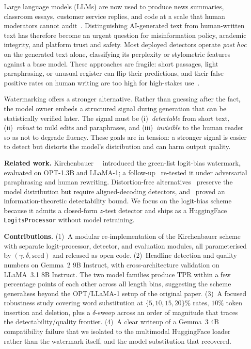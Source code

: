\documentclass[10pt,twocolumn,letterpaper]{article}
\begin{document}
Large language models (LLMs) are now used to produce news summaries, classroom essays, customer service replies, and code at a scale that human moderators cannot audit~\cite{kirchenbauer2023,kirchenbauer2024reliability}. Distinguishing AI-generated text from human-written text has therefore become an urgent question for misinformation policy, academic integrity, and platform trust and safety. Most deployed detectors operate \emph{post hoc} on the generated text alone, classifying its perplexity or stylometric features against a base model. These approaches are fragile: short passages, light paraphrasing, or unusual register can flip their predictions, and their false-positive rates on human writing are too high for high-stakes use~\cite{kirchenbauer2024reliability}.

Watermarking offers a stronger alternative. Rather than guessing after the fact, the model owner embeds a structured signal during generation that can be statistically verified later. The signal must be (i)~\emph{detectable} from short text, (ii)~\emph{robust} to mild edits and paraphrases, and (iii)~\emph{invisible} to the human reader so as not to degrade fluency. These goals are in tension: a stronger signal is easier to detect but distorts the model's distribution and can harm output quality.

\textbf{Related work.} Kirchenbauer~\etal~\cite{kirchenbauer2023} introduced the green-list logit-bias watermark, evaluated on OPT-1.3B and LLaMA-1; a follow-up~\cite{kirchenbauer2024reliability} re-tested it under adversarial paraphrasing and human rewriting. Distortion-free alternatives~\cite{kuditipudi2023robust} preserve the model distribution but require aligned-decoding detectors, and~\cite{christ2024undetectable} proved an information-theoretic detectability bound. We focus on the logit-bias scheme because it admits a closed-form $z$-test detector and ships as a HuggingFace \texttt{LogitsProcessor} without model retraining.

\textbf{Contributions.} (1)~A modular re-implementation of the Kirchenbauer scheme with separate logit-processor, detector, and evaluation modules, all parameterised by $(\gamma,\delta,\text{seed})$ and released as open code. (2)~Headline detection and quality numbers on Gemma~2 9B Instruct, with cross-architecture validation on LLaMA~3.1 8B Instruct. The two model families produce TPR within a few percentage points of each other across all length bins, suggesting the scheme generalises beyond the OPT/LLaMA-1 setup of the original paper. (3)~A focused robustness study covering word substitution at $\{5,10,15,20\}\%$ rates, $10\%$ token insertion and deletion, plus a $\delta$-sweep across an order of magnitude that traces the detectability/quality frontier. (4)~A clear writeup of a Gemma~3 4B compatibility failure that we isolated to the multimodal HuggingFace loader rather than the watermark itself, and the model substitution that recovered.
\end{document}
